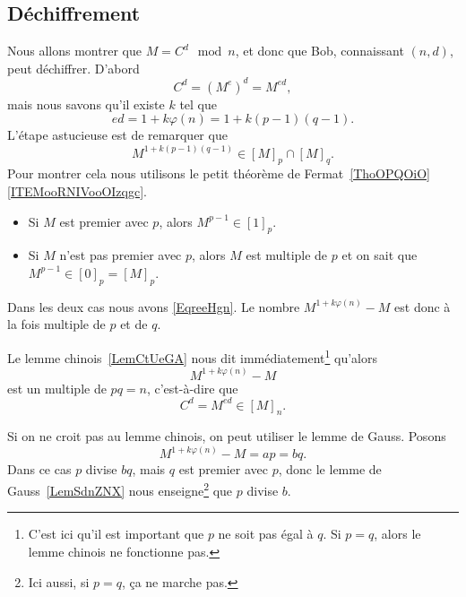 \subsection{Déchiffrement}

Nous allons montrer que \( M=C^d\mod n\), et donc que Bob, connaissant \( (n,d)\), peut déchiffrer. D'abord
\begin{equation}
    C^d=(M^e)^d=M^{ed},
\end{equation}
mais nous savons qu'il existe \( k\) tel que
\begin{equation}
    ed=1+k\varphi(n)=1+k(p-1)(q-1).
\end{equation}
L'étape astucieuse est de remarquer que
\begin{equation}    \label{EqreeHgn}
    M^{1+k(p-1)(q-1)}\in [M]_p\cap[M]_q.
\end{equation}
Pour montrer cela nous utilisons le petit théorème de Fermat~\ref{ThoOPQOiO}\ref{ITEMooRNIVooOIzqgc}.
\begin{itemize}
    \item Si \( M\) est premier avec \( p\), alors \( M^{p-1}\in[1]_p\).
    \item Si \( M\) n'est pas premier avec \( p\), alors \( M\) est multiple de \( p\) et on sait que \( M^{p-1}\in[0]_p=[M]_p\).
\end{itemize}
Dans les deux cas nous avons \eqref{EqreeHgn}. Le nombre \( M^{1+k\varphi(n)}-M\) est donc à la fois multiple de \( p\) et de \( q\).

Le lemme chinois~\ref{LemCtUeGA} nous dit immédiatement\footnote{C'est ici qu'il est important que \( p\) ne soit pas égal à \( q\). Si \( p=q\), alors le lemme chinois ne fonctionne pas.} qu'alors
\begin{equation}
    M^{1+k\varphi(n)}-M
\end{equation}
est un multiple de \( pq=n\), c'est-à-dire que
\begin{equation}
    C^d=M^{ed}\in [M]_n.
\end{equation}

Si on ne croit pas au lemme chinois, on peut utiliser le lemme de Gauss. Posons
\begin{equation}
    M^{1+k\varphi(n)}-M=ap=bq.
\end{equation}
Dans ce cas \( p\) divise \( bq\), mais \( q\) est premier avec \( p\), donc le lemme de Gauss~\ref{LemSdnZNX} nous enseigne\footnote{Ici aussi, si \( p=q\), ça ne marche pas.} que \( p\) divise \( b\).

